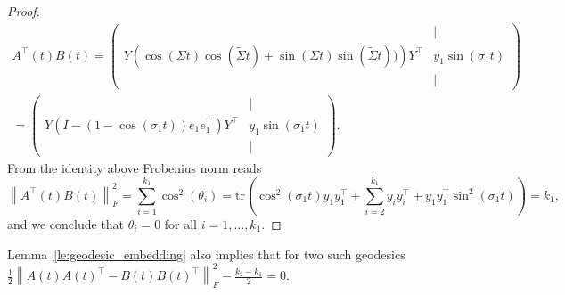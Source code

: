 \documentclass{article}
\begin{document}
\begin{proof}
\begin{multline}
	A^\top(t) B(t) = 	
	\begin{pmatrix}
		& | \\
		Y\left( \cos\left(\Sigma t\right) \cos\left(\widetilde{\Sigma} t\right) + \sin\left(\Sigma t\right) \sin\left(\widetilde{\Sigma} t\right))\right)Y^\top & y_1 \sin(\sigma_1 t)\\
		&|
	\end{pmatrix} \\= 
	\begin{pmatrix}
		& | \\
		Y\left(I - (1 - \cos(\sigma_1 t))e_1 e_1^\top\right)Y^\top & y_1 \sin(\sigma_1 t)\\
		&|
	\end{pmatrix}.
\end{multline}
From the identity above Frobenius norm reads
\begin{equation}
	\left\|A^\top(t) B(t)\right\|_{F}^2 = \sum_{i=1}^{k_1}\cos^2(\theta_i) = \text{tr}\left(\cos^2(\sigma_1 t) y_1 y_1^\top + \sum_{i=2}^{k_1} y_{i} y_{i}^{\top} + y_1 y_1^\top \sin^2(\sigma_1 t)\right) = k_1,
\end{equation}
and we conclude that $\theta_i = 0$ for all $i=1,\dots, k_1$. 
\end{proof}
Lemma~\ref{le:geodesic_embedding} also implies that for two such geodesics $\frac{1}{2}\left\|A(t) A(t)^{\top} - B(t) B(t)^{\top}\right\|_{F}^2 - \frac{k_2-k_1}{2} = 0$.
\end{document}
